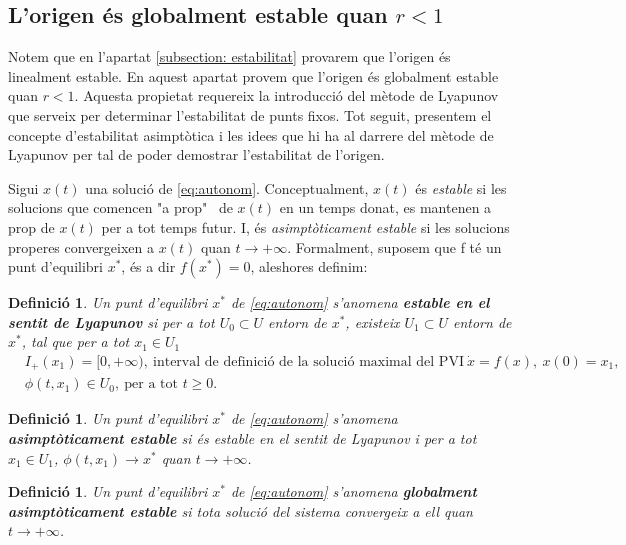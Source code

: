 \documentclass[11pt,a4paper,openright,oneside]{article}
\numberwithin{equation}{section}
\newtheorem{defi}[teo]{Definici\'o}
\theoremstyle{definition}
\begin{document}
\subsection*{L'origen és globalment estable quan $r<1$}
Notem que en l'apartat \eqref{subsection: estabilitat} provarem que l'origen és linealment estable. En aquest apartat provem que l'origen és globalment estable quan $r<1$. Aquesta propietat requereix la introducció del mètode de Lyapunov que serveix per determinar l'estabilitat de punts fixos. Tot seguit, presentem el concepte d'estabilitat asimptòtica i les idees que hi ha al darrere del mètode de Lyapunov per tal de poder demostrar l'estabilitat de l'origen. 

Sigui $x(t)$ una solució de \eqref{eq:autonom}. Conceptualment, $x(t)$ és \textit{estable} si les solucions que comencen "a prop" \ de $x(t)$ en un temps donat, es mantenen a prop de $x(t)$ per a tot temps futur. I, és \textit{asimptòticament estable} si les solucions properes convergeixen a $x(t)$ quan $t\rightarrow{+\infty}$.
Formalment, suposem que f té un punt d'equilibri $x^{*}$, és a dir $f(x^{*})=0$, aleshores definim:

\begin{defi} \label{defi:estable}
    Un punt d'equilibri $x^{*}$ de \eqref{eq:autonom} s'anomena \textbf{estable en el sentit de Lyapunov} si per a tot $U_0 \subset U$ entorn de $x^{*}$, existeix $U_1 \subset U$ entorn de $x^{*}$, tal que per a tot $x_1\in U_1$ \begin{equation*} \begin{aligned}
        &I_+(x_1)=[0,+\infty), \ \text{interval de definició de la solució maximal del PVI} \ \dot{x}=f(x), \ x(0)=x_1, \\
        &\phi(t,x_1)\in U_0, \ \text{per a tot $t\geq0$}.
    \end{aligned}\end{equation*}
\end{defi}

\begin{defi} \label{defi:asestable}
    Un punt d'equilibri $x^{*}$ de \eqref{eq:autonom} s'anomena \textbf{asimptòticament estable} si és estable en el sentit de Lyapunov i per a tot  $x_1 \in U_1$, $\phi(t,x_1)\rightarrow{x^*}$ quan $t\rightarrow{+\infty}$.
\end{defi} 
  
\begin{defi} \label{defi:glestable}
      Un punt d'equilibri $x^{*}$ de \eqref{eq:autonom} s'anomena \textbf{globalment asimptòticament estable} si tota solució del sistema convergeix a ell quan $t\rightarrow{+\infty}$.
\end{defi}
\end{document}
